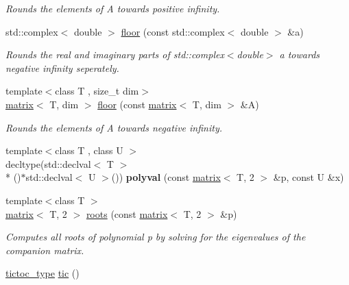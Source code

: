 \begin{DoxyCompactItemize}
\begin{DoxyCompactList}\small\item\em Rounds the elements of A towards positive infinity. \end{DoxyCompactList}\item 
\hypertarget{namespacekeycpp_ab30437496fbd2011521b31aee7961516}{std\-::complex$<$ double $>$ \hyperlink{namespacekeycpp_ab30437496fbd2011521b31aee7961516}{floor} (const std\-::complex$<$ double $>$ \&a)}\label{namespacekeycpp_ab30437496fbd2011521b31aee7961516}

\begin{DoxyCompactList}\small\item\em Rounds the real and imaginary parts of std\-::complex$<$double$>$ a towards negative infinity seperately. \end{DoxyCompactList}\item 
\hypertarget{namespacekeycpp_a8aad0f0ac8036ee114a14da17aefcb5f}{{\footnotesize template$<$class T , size\-\_\-t dim$>$ }\\\hyperlink{classkeycpp_1_1matrix}{matrix}$<$ T, dim $>$ \hyperlink{namespacekeycpp_a8aad0f0ac8036ee114a14da17aefcb5f}{floor} (const \hyperlink{classkeycpp_1_1matrix}{matrix}$<$ T, dim $>$ \&A)}\label{namespacekeycpp_a8aad0f0ac8036ee114a14da17aefcb5f}

\begin{DoxyCompactList}\small\item\em Rounds the elements of A towards negative infinity. \end{DoxyCompactList}\item 
\hypertarget{namespacekeycpp_ad5d215fa6882ff492cec0c3958fabadb}{{\footnotesize template$<$class T , class U $>$ }\\decltype(std\-::declval$<$ T $>$\\*
()$\ast$std\-::declval$<$ U $>$()) {\bfseries polyval} (const \hyperlink{classkeycpp_1_1matrix}{matrix}$<$ T, 2 $>$ \&p, const U \&x)}\label{namespacekeycpp_ad5d215fa6882ff492cec0c3958fabadb}

\item 
\hypertarget{namespacekeycpp_a11ba1fe24c04df74326c1289f82fe980}{{\footnotesize template$<$class T $>$ }\\\hyperlink{classkeycpp_1_1matrix}{matrix}$<$ T, 2 $>$ \hyperlink{namespacekeycpp_a11ba1fe24c04df74326c1289f82fe980}{roots} (const \hyperlink{classkeycpp_1_1matrix}{matrix}$<$ T, 2 $>$ \&p)}\label{namespacekeycpp_a11ba1fe24c04df74326c1289f82fe980}

\begin{DoxyCompactList}\small\item\em Computes all roots of polynomial p by solving for the eigenvalues of the companion matrix. \end{DoxyCompactList}\item 
\hypertarget{namespacekeycpp_a6069a9eec0edfa1d401230013d98765e}{\hyperlink{structkeycpp_1_1tictoc__type}{tictoc\-\_\-type} \hyperlink{namespacekeycpp_a6069a9eec0edfa1d401230013d98765e}{tic} ()}\label{namespacekeycpp_a6069a9eec0edfa1d401230013d98765e}


\end{DoxyCompactItemize}
